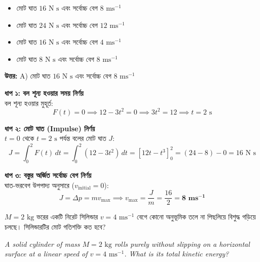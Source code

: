 \documentclass[12pt, a4paper]{article}
\begin{document}
\begin{itemize}[label={}, leftmargin=1cm, itemsep=0.5em]
\item[\textbf{A)}] মোট ঘাত $16\text{ N s}$ এবং সর্বোচ্চ বেগ $8\text{ ms}^{-1}$
\item[\textbf{B)}] মোট ঘাত $24\text{ N s}$ এবং সর্বোচ্চ বেগ $12\text{ ms}^{-1}$
\item[\textbf{C)}] মোট ঘাত $16\text{ N s}$ এবং সর্বোচ্চ বেগ $4\text{ ms}^{-1}$
\item[\textbf{D)}] মোট ঘাত $8\text{ N s}$ এবং সর্বোচ্চ বেগ $8\text{ ms}^{-1}$
\end{itemize}
\vspace{0.5em}

\begin{tcolorbox}[answerbox]
\textbf{\color{success} উত্তর:} A) মোট ঘাত $16\text{ N s}$ এবং সর্বোচ্চ বেগ $8\text{ ms}^{-1}$
\end{tcolorbox}
\vspace{1em}

\begin{tcolorbox}[solutionbox={সমাধান (Solution)}]
\noindent
\textbf{ধাপ ১: বল শূন্য হওয়ার সময় নির্ণয়} \\
বল শূন্য হওয়ার মুহূর্ত:
\[F(t) = 0 \implies 12 - 3t^2 = 0 \implies 3t^2 = 12 \implies t = 2\text{ s}\]

\vspace{0.5em}
\noindent\textbf{ধাপ ২: মোট ঘাত (Impulse) নির্ণয়} \\
$t = 0$ থেকে $t = 2\text{ s}$ পর্যন্ত বলের মোট ঘাত $J$:
\[J = \int_0^2 F(t) \, dt = \int_0^2 (12 - 3t^2) \, dt = \left[12t - t^3\right]_0^2 = (24 - 8) - 0 = 16\text{ N s}\]

\vspace{0.5em}
\noindent\textbf{ধাপ ৩: বস্তুর অর্জিত সর্বোচ্চ বেগ নির্ণয়} \\
ঘাত-ভরবেগ উপপাদ্য অনুসারে ($v_{\text{initial}} = 0$):
\[J = \Delta p = m v_{\text{max}} \implies v_{\text{max}} = \frac{J}{m} = \frac{16}{2} = \mathbf{8\text{ ms}^{-1}}\]
\end{tcolorbox}
\begin{tcolorbox}[questionbox={প্রশ্ন (Question) 38}]
    \noindent
    $M = 2\text{ kg}$ ভরের একটি নিরেট সিলিন্ডার $v = 4\text{ ms}^{-1}$ বেগে কোনো অনুভূমিক তলে না পিছলিয়ে বিশুদ্ধ গড়িয়ে চলছে। সিলিন্ডারটির মোট গতিশক্তি কত হবে?
    
    \vspace{0.8em}
    \begin{english}
    \noindent\textit{\color{darkgray}
    A solid cylinder of mass $M = 2\text{ kg}$ rolls purely without slipping on a horizontal surface at a linear speed of $v = 4\text{ ms}^{-1}$. What is its total kinetic energy?
    }
    \end{english}
\end{tcolorbox}
\end{document}
